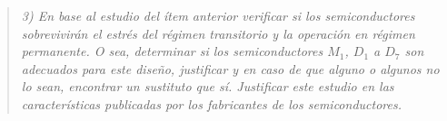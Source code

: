 \begin{quote} \textit{3) En base al estudio del ítem anterior verificar si los semiconductores sobrevivirán el estrés del régimen transitorio y la operación en régimen permanente. O sea, determinar si los semiconductores $M_1$, $D_1$ a $D_7$ son adecuados para este diseño, justificar y en caso de que alguno o algunos no lo sean, encontrar un sustituto que sí. Justificar este estudio en las características publicadas por los fabricantes de los semiconductores. }
\end{quote}
